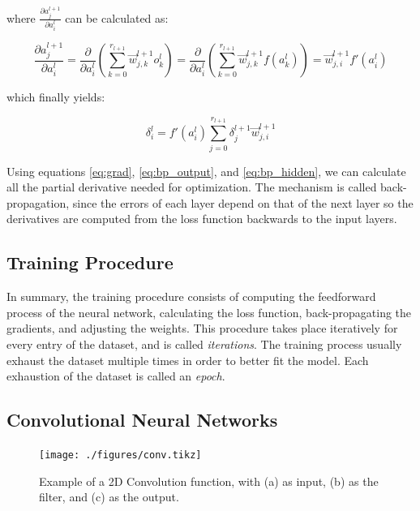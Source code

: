 \documentclass[12pt,a4paper,]{report}
\begin{document}
where \(\frac{\partial a^{l+1}_j}{\partial a^{l}_i}\) can be calculated
as:

\begin{equation}
    \frac{\partial a^{l+1}_j}{\partial a^{l}_i}
    = \frac{\partial}{\partial a^{l}_i} (\sum_{k=0}^{r_{l+1}} \vec{w}^{l+1}_{j, k} o^{l}_k)
    = \frac{\partial}{\partial a^{l}_i} (\sum_{k=0}^{r_{l+1}} \vec{w}^{l+1}_{j, k} f(a^{l}_k))
    = \vec{w}^{l+1}_{j, i} f'(a^{l}_i)
\end{equation}

which finally yields:

\begin{equation}
\delta^l_i = f'(a^{l}_i) \sum_{j=0}^{r_{l+1}} \delta^{l+1}_j \vec{w}^{l+1}_{j, i}  \label{eq:bp_hidden}
\end{equation}

Using equations \ref{eq:grad}, \ref{eq:bp_output}, and
\ref{eq:bp_hidden}, we can calculate all the partial derivative needed
for optimization. The mechanism is called back-propagation, since the
errors of each layer depend on that of the next layer so the derivatives
are computed from the loss function backwards to the input layers.

\hypertarget{training-procedure}{%
\subsection{Training Procedure}\label{training-procedure}}

In summary, the training procedure consists of computing the feedforward
process of the neural network, calculating the loss function,
back-propagating the gradients, and adjusting the weights. This
procedure takes place iteratively for every entry of the dataset, and is
called \emph{iterations}. The training process usually exhaust the
dataset multiple times in order to better fit the model. Each exhaustion
of the dataset is called an \emph{epoch}.

\hypertarget{convolutional-neural-networks}{%
\subsection{Convolutional Neural
Networks}\label{convolutional-neural-networks}}

\begin{figure}[h]
    \texttt{[image: ./figures/conv.tikz]}
    \centering
    \caption[Example of a 2D Convolution function]{Example of a 2D Convolution function, with (a) as input, (b) as the filter, and (c) as the output.} \label{fig:conv}
\end{figure}
\end{document}
